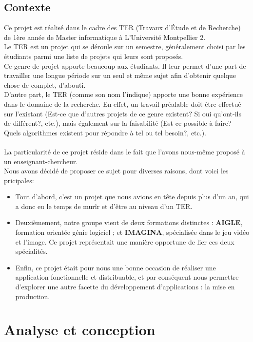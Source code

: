 \documentclass{report}
\begin{document}
		\section{Contexte}
		Ce projet est réalisé dans le cadre des TER (Travaux d'Étude et de Recherche) de 1ère année de Master informatique à L'Université Montpellier 2. \\
		Le TER est un projet qui se déroule sur un semestre, généralement choisi par les étudiants parmi une liste de projets qui leurs sont proposés. \\Ce genre de projet apporte beaucoup aux étudiants. Il leur permet d'une part de travailler une longue période sur un seul et même sujet afin d'obtenir quelque chose de complet, d'abouti. \\D'autre part, le TER (comme son nom l'indique) apporte une bonne expérience dans le domaine de la recherche. En effet, un travail préalable doit être effectué sur l'existant (Est-ce que d'autres projets de ce genre existent? Si oui qu'ont-ils de différent?, etc.), mais également sur la faisabilité (Est-ce possible à faire? Quels algorithmes existent pour répondre à tel ou tel besoin?, etc.). \\
		$$$$ \\
		La particularité de ce projet réside dans le fait que l'avons nous-même proposé à un enseignant-chercheur.\\
		Nous avons décidé de proposer ce sujet pour diverses raisons, dont voici les pricipales:
		\begin{itemize}
			\item Tout d'abord, c'est un projet que nous avions en tête depuis plus d'un an, qui a donc eu le temps de murîr et d'être au niveau d'un TER.
			\item Deuxièmement, notre groupe vient de deux formations distinctes : \textbf{AIGLE}, formation orientée génie logiciel ; et \textbf{IMAGINA}, spécialisée dans le jeu vidéo et l'image. Ce projet représentait une manière opportune de lier ces deux spécialités.
			\item Enfin, ce projet était pour nous une bonne occasion de réaliser une application fonctionnelle et distribuable, et par conséquent nous permettre d'explorer une autre facette du développement d'applications : la mise en production.

		\end{itemize}	
	\chapter{Analyse et conception}
\end{document}
